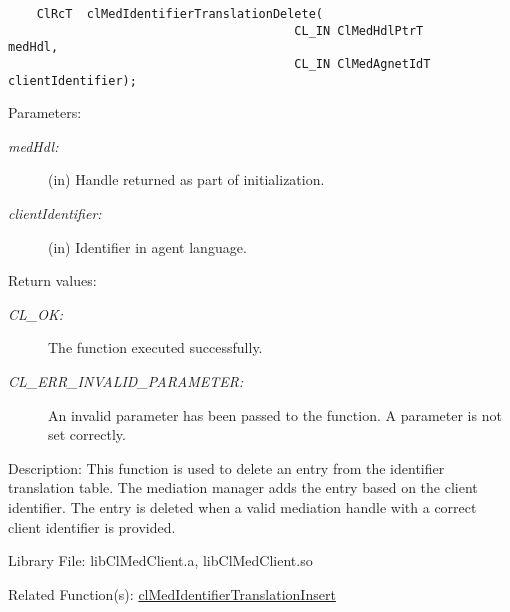 \begin{flushleft}
\begin{Desc}
\footnotesize\begin{verbatim}    ClRcT  clMedIdentifierTranslationDelete(
                              			CL_IN ClMedHdlPtrT       medHdl,
                              			CL_IN ClMedAgnetIdT    clientIdentifier);
\end{verbatim}
\normalsize
\end{Desc}
\begin{Desc}
\item[Parameters:]
\begin{description}
\item[{\em med\-Hdl:}](in) Handle returned as part of initialization. 
\item[{\em client\-Identifier:}](in) Identifier in agent language.\end{description}
\end{Desc}
\begin{Desc}
\item[Return values:]
\begin{description}
\item[{\em CL\_\-OK:}]The function executed successfully. 
\item[{\em CL\_\-ERR\_\-INVALID\_\-PARAMETER:}]An invalid parameter has been passed to the function. A parameter is not set correctly.\end{description}
\end{Desc}
\begin{Desc}
\item[Description:]This function is used to delete an entry from the identifier translation table. The mediation manager adds the entry based on the
client identifier. The entry is deleted when a valid mediation handle with a correct client identifier is provided.\end{Desc}
\begin{Desc}
\item[Library File:]lib\-Cl\-Med\-Client.a, lib\-Cl\-Med\-Client.so\end{Desc}
\begin{Desc}
\item[Related Function(s):]\hyperlink{pagemed104}{cl\-Med\-Identifier\-Translation\-Insert} \end{Desc}
\newpage



\end{flushleft}

